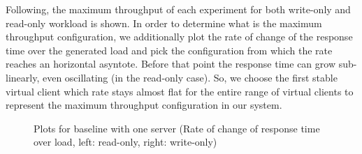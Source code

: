\documentclass[11pt,a4paper]{article}
\begin{document}
Following, the maximum throughput of each experiment for both write-only and read-only workload is shown.
In order to determine what is the maximum throughput configuration, we additionally plot the rate of change of the response time over the generated load and pick the configuration from which the rate reaches an horizontal asyntote.
Before that point the response time can grow sub-linearly, even oscillating (in the read-only case). So, we choose the first stable virtual client which rate stays almost flat for the entire range of virtual clients to represent the maximum throughput configuration in our system.

\begin{figure}[!h]
  \centering
  \caption{Plots for baseline with one server (Rate of change of response time over load, left: read-only, right: write-only)}
  \label{fig:baseline_no_mw_1_server_maxtp}
\end{figure}
\end{document}
